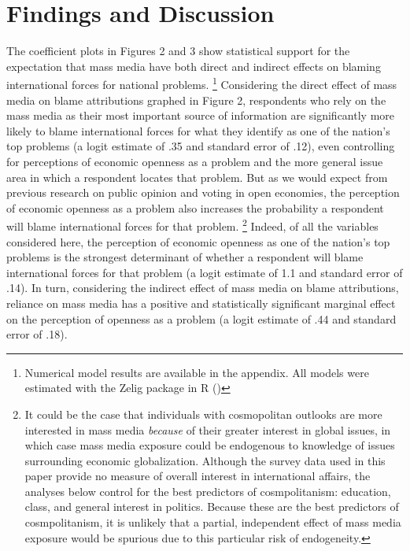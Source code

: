 \documentclass[12pt]{report}
\begin{document}
\section{Findings and Discussion}

The coefficient plots in Figures 2 and 3 show statistical support for the expectation that mass
media have both direct and indirect effects on blaming international forces for national problems.
\footnote{Numerical model results are available in the appendix. All models were estimated with the
Zelig package in R (\citealt{ZeligEveryonesSt:2009ts})} Considering the direct effect of mass
media on blame attributions graphed in Figure 2, respondents who rely on the mass media as their
most important source of information are significantly more likely to blame international forces for
what they identify as one of the nation's top problems (a logit estimate of .35 and standard error
of .12), even controlling for perceptions of economic openness as a problem and the more general
issue area in which a respondent locates that problem. But as we would expect from previous research
on public opinion and voting in open economies, the perception of economic openness as a problem
also increases the probability a respondent will blame international forces for that problem.
\footnote{It could be the case that individuals with cosmopolitan outlooks are more interested in
mass media \emph{because} of their greater interest in global issues, in which case mass media
exposure could be endogenous to knowledge of issues surrounding economic globalization. Although the
survey data used in this paper provide no measure of overall interest in international affairs, the
analyses below control for the best predictors of cosmpolitanism: education, class, and general
interest in politics. Because these are the best predictors of cosmpolitanism, it is unlikely that a
partial, independent effect of mass media exposure would be spurious due to this particular risk of
endogeneity.} Indeed, of all the variables considered here, the perception of economic openness as
one of the nation's top problems is the strongest determinant of whether a respondent will blame
international forces for that problem (a logit estimate of 1.1 and standard error of .14). In turn,
considering the indirect effect of mass media on blame attributions, reliance on mass media has a
positive and statistically significant marginal effect on the perception of openness as a problem (a
logit estimate of .44 and standard error of .18).
\end{document}
